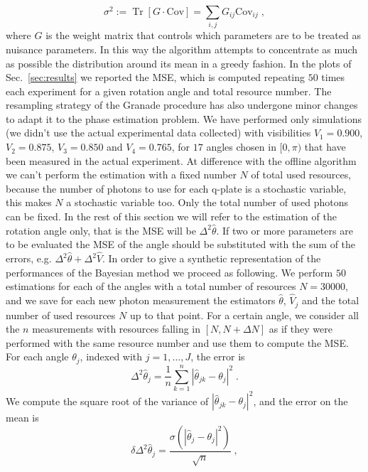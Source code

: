 \documentclass[aps, pra, 10pt, twocolumn, superscriptaddress,floatfix]{revtex4-1}
\DeclareMathOperator{\tr}{Tr}
\begin{document}
%
\begin{equation}
	\sigma^2 := \tr \left[ G \cdot \text{Cov} \right] = \sum_{i, j} G_{ij} \text{Cov}_{ij} \; ,
\end{equation}
%
where $G$ is the weight matrix that controls which parameters are to be treated as nuisance parameters. In this way the algorithm attempts to concentrate as much as possible the distribution around its mean in a greedy fashion. In the plots of Sec.~\ref{sec:results} we reported the MSE, which is computed repeating $50$ times each experiment for a given rotation angle and total resource number. The resampling strategy of the Granade procedure has also undergone minor changes to adapt it to the phase estimation problem. We have performed only simulations (we didn't use the actual experimental data collected) with visibilities $V_1 = 0.900$, $V_2 = 0.875$, $V_3 = 0.850$ and $V_4 = 0.765$, for $17$ angles chosen in $[0, \pi)$ that have been measured in the actual experiment. At difference with the offline algorithm we can't perform the estimation with a fixed number $N$ of total used resources, because the number of photons to use for each q-plate is a stochastic variable, this makes $N$ a stochastic variable too. Only the total number of used photons can be fixed.  In the rest of this section we will refer to the estimation of the rotation angle only, that is the MSE will be $\Delta^2 \hat{\theta}$. If two or more parameters are to be evaluated the MSE of the angle should be substituted with the sum of the errors, e.g. $\Delta^2 \hat{\theta} + \Delta^2 \hat{V}$. In order to give a synthetic representation of the performances of the Bayesian method we proceed as following. We perform $50$ estimations for each of the angles with a total number of resources $N=30000$, and we save for each new photon measurement the estimators $\hat{\theta}$, $\hat{V}_j$ and the total number of used resources $N$ up to that point. For a certain angle, we consider all the $n$ measurements with resources falling in $[N, N+\Delta N]$ as if they were performed with the same resource number and use them to compute the MSE. For each angle $\theta_j$, indexed with $j=1, \dots, J$, the error is
%
\begin{equation}
	\Delta^2 \hat{\theta}_j = \frac{1}{n} \sum \limits_{k=1}^{n} | \hat{\theta}_{jk} - \theta_j |^2 \; .
\end{equation}
%
We compute the square root of the variance of $| \hat{\theta}_{jk} - \theta_j |^2$, and the error on the mean is
%
\begin{equation}
	\delta \Delta^2 \hat{\theta}_j = \frac{ \sigma \left( | \hat{\theta}_j - \theta_j |^2 \right)}{\sqrt{n}} \; ,
\end{equation}
\end{document}
